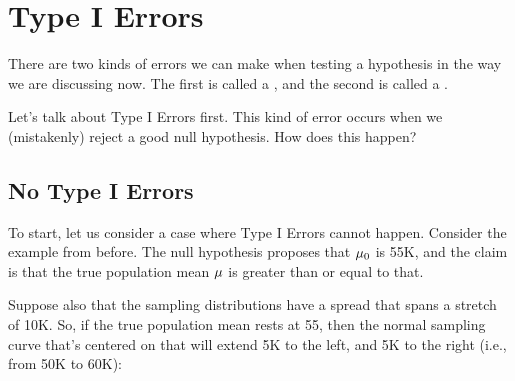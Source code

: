 \documentclass[../../../main.tex]{subfiles}
\begin{document}
\chapter{Type I Errors}


There are two kinds of errors we can make when testing a hypothesis in the way we are discussing now. The first is called a , and the second is called a . 

Let's talk about Type I Errors first. This kind of error occurs when we (mistakenly) reject a good null hypothesis. How does this happen?


\section{No Type I Errors}

To start, let us consider a case where Type I Errors cannot happen. Consider the example from before. The null hypothesis proposes that $\HypPopMean/$ is 55K, and the claim is that the true population mean $\mu$ is greater than or equal to that. 

Suppose also that the sampling distributions have a spread that spans a stretch of 10K. So, if the true population mean rests at 55, then the normal sampling curve that's centered on that will extend 5K to the left, and 5K to the right (i.e., from 50K to 60K):

\begin{center}
\end{center}
\end{document}
